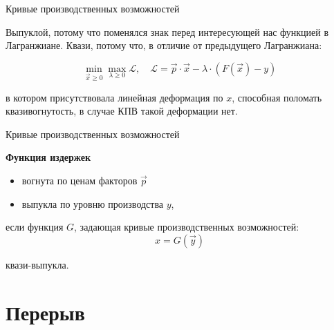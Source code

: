 \documentclass{beamer}
\begin{document}
\begin{frame}{Кривые производственных возможностей}

Выпуклой, потому что поменялся знак перед интересующей нас функцией в Лагранжиане. Квази, потому что, в отличие от предыдущего Лагранжиана:

$$ \min_{\vec x \geqslant 0} \max_{\lambda \geqslant 0} \mathcal{L}, \quad \mathcal{L} = \vec p \cdot \vec x - \lambda \cdot (F(\vec x) - y)$$

в котором присутствовала линейная деформация по $x$, способная поломать квазивогнутость, в случае КПВ такой деформации нет.
\end{frame}

\begin{frame}{Кривые производственных возможностей}
\begin{lemma}
\textbf{Функция издержек}

\begin{itemize}
\item вогнута по ценам факторов $\vec p$
\item выпукла по уровню производства $y$,
\end{itemize}

если функция $G$, задающая кривые производственных возможностей:
$$x = G(\vec y)$$

квази-выпукла.
\end{lemma}
\end{frame}

\section{Перерыв}
\end{document}
